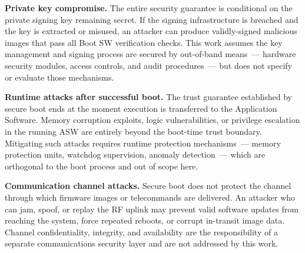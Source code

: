 \textbf{Private key compromise.} The entire security guarantee is conditional on the private signing key remaining secret. If the signing infrastructure is breached and the key is extracted or misused, an attacker can produce validly-signed malicious images that pass all Boot SW verification checks. This work assumes the key management and signing process are secured by out-of-band means~--- hardware security modules, access controls, and audit procedures~--- but does not specify or evaluate those mechanisms.

\textbf{Runtime attacks after successful boot.} The trust guarantee established by secure boot ends at the moment execution is transferred to the Application Software. Memory corruption exploits, logic vulnerabilities, or privilege escalation in the running ASW are entirely beyond the boot-time trust boundary. Mitigating such attacks requires runtime protection mechanisms~--- memory protection units, watchdog supervision, anomaly detection~--- which are orthogonal to the boot process and out of scope here.

\textbf{Communication channel attacks.} Secure boot does not protect the channel through which firmware images or telecommands are delivered. An attacker who can jam, spoof, or replay the RF uplink may prevent valid software updates from reaching the system, force repeated reboots, or corrupt in-transit image data. Channel confidentiality, integrity, and availability are the responsibility of a separate communications security layer and are not addressed by this work.